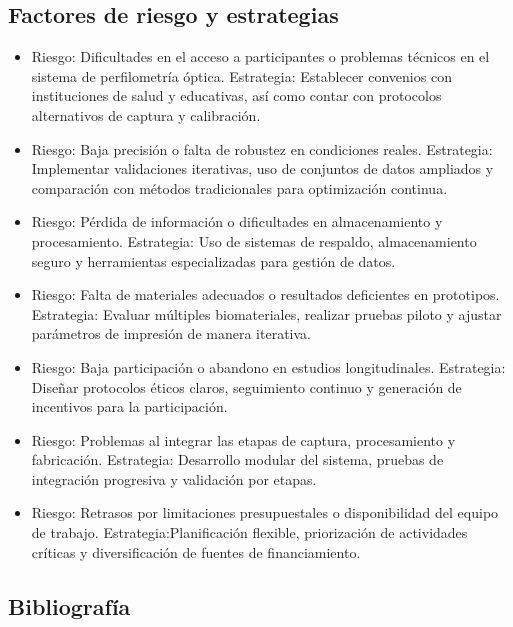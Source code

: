 \documentclass[12pt,a4paper]{article}
\begin{document}
\subsection{Factores de riesgo y estrategias}
\begin{itemize}
    \item Riesgo: Dificultades en el acceso a participantes o problemas técnicos en el sistema de perfilometría óptica. Estrategia: Establecer convenios con instituciones de salud y educativas, así como contar con protocolos alternativos de captura y calibración. 
    \item Riesgo: Baja precisión o falta de robustez en condiciones reales. Estrategia: Implementar validaciones iterativas, uso de conjuntos de datos ampliados y comparación con métodos tradicionales para optimización continua.
    \item Riesgo: Pérdida de información o dificultades en almacenamiento y procesamiento. Estrategia: Uso de sistemas de respaldo, almacenamiento seguro y herramientas especializadas para gestión de datos.
    \item Riesgo: Falta de materiales adecuados o resultados deficientes en prototipos. Estrategia: Evaluar múltiples biomateriales, realizar pruebas piloto y ajustar parámetros de impresión de manera iterativa.
    \item Riesgo: Baja participación o abandono en estudios longitudinales. Estrategia: Diseñar protocolos éticos claros, seguimiento continuo y generación de incentivos para la participación.
    \item Riesgo: Problemas al integrar las etapas de captura, procesamiento y fabricación. Estrategia: Desarrollo modular del sistema, pruebas de integración progresiva y validación por etapas.
    \item Riesgo: Retrasos por limitaciones presupuestales o disponibilidad del equipo de trabajo. Estrategia:Planificación flexible, priorización de actividades críticas y diversificación de fuentes de financiamiento.
\end{itemize}

\subsection{Bibliografía}


\end{document}

